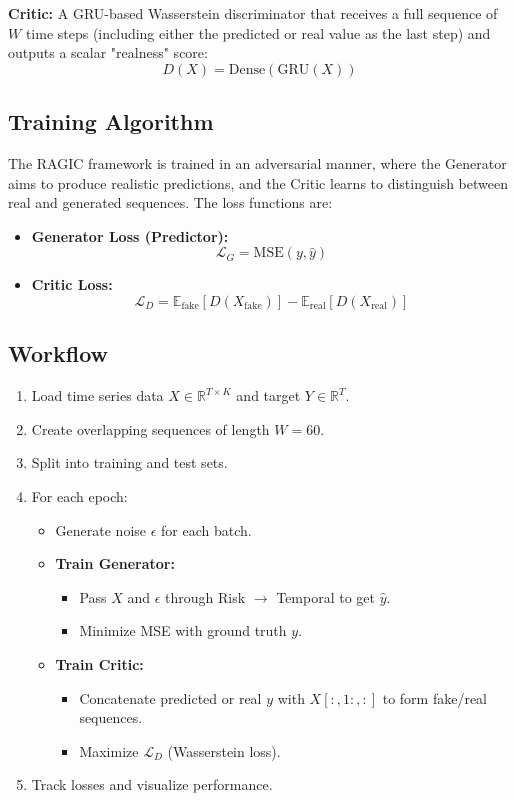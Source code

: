 \textbf{Critic:} A GRU-based Wasserstein discriminator that receives a full sequence of $W$ time steps (including either the predicted or real value as the last step) and outputs a scalar "realness" score:
\[
D(X) = \text{Dense}(\text{GRU}(X))
\]

\subsection{Training Algorithm}

The RAGIC framework is trained in an adversarial manner, where the Generator aims to produce realistic predictions, and the Critic learns to distinguish between real and generated sequences. The loss functions are:

\begin{itemize}
    \item \textbf{Generator Loss (Predictor):}
    \[
    \mathcal{L}_G = \text{MSE}(y, \hat{y})
    \]
    
    \item \textbf{Critic Loss:}
    \[
    \mathcal{L}_D = \mathbb{E}_{\text{fake}}[D(X_{\text{fake}})] - \mathbb{E}_{\text{real}}[D(X_{\text{real}})]
    \]
\end{itemize}

\subsection{Workflow}

\begin{enumerate}
    \item Load time series data $X \in \mathbb{R}^{T \times K}$ and target $Y \in \mathbb{R}^T$.
    \item Create overlapping sequences of length $W=60$.
    \item Split into training and test sets.
    \item For each epoch:
    \begin{itemize}
        \item Generate noise $\epsilon$ for each batch.
        \item \textbf{Train Generator:}
            \begin{itemize}
                \item Pass $X$ and $\epsilon$ through Risk $\rightarrow$ Temporal to get $\hat{y}$.
                \item Minimize MSE with ground truth $y$.
            \end{itemize}
        \item \textbf{Train Critic:}
            \begin{itemize}
                \item Concatenate predicted or real $y$ with $X[:, 1:, :]$ to form fake/real sequences.
                \item Maximize $\mathcal{L}_D$ (Wasserstein loss).
            \end{itemize}
    \end{itemize}
    \item Track losses and visualize performance.
\end{enumerate}

